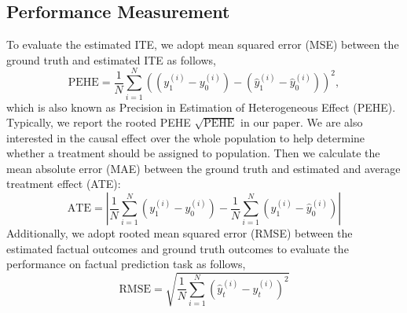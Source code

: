 
\subsection{Performance Measurement}
To evaluate the estimated ITE, we adopt mean squared error (MSE) between the ground truth and estimated ITE as follows,
\begin{equation}
    \text{PEHE} = \frac{1}{N}\sum_{i=1}^{N}((y^{(i)}_{1}-y^{(i)}_{0})-(\hat{y}^{(i)}_{1}-\hat{y}^{(i)}_{0}))^{2},
\end{equation}
which is also known as Precision in Estimation of Heterogeneous Effect (PEHE). Typically, we report the rooted PEHE $\sqrt{\text{PEHE}}$ in our paper. We are also interested in the causal effect over the whole population to help determine whether a treatment should be assigned to population. Then we calculate the mean absolute error (MAE) between the ground truth and estimated and average treatment effect (ATE):
\begin{equation}
    \text{ATE}=|\frac{1}{N}\sum_{i=1}^{N}(y^{(i)}_{1}-y^{(i)}_{0})-\frac{1}{N}\sum_{i=1}^{N}(\hat{y}^{(i)}_{1}-\hat{y}^{(i)}_{0})|
\end{equation}
Additionally, we adopt rooted mean squared error (RMSE) between the estimated factual outcomes and ground truth outcomes to evaluate the performance on factual prediction task as follows,
\begin{equation}
\text{RMSE} = \sqrt{\frac{1}{N}\sum_{i=1}^{N}(\hat{y}^{(i)}_{t}-y^{(i)}_{t})^2}
\end{equation}

